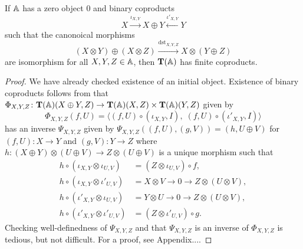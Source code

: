 \begin{proposition}\label{prop:biproduct}
  If $\mathbb{A}$ has a zero object $0$ and binary coproducts
  \begin{equation*}
    X \xrightarrow{\iota_{X,Y}} X \oplus Y \xleftarrow{\iota'_{X,Y}} Y
  \end{equation*}
  such that the canonoical morphisms
  \begin{equation*}
    (X \otimes Y) \oplus (X \otimes Z) \xrightarrow{\mathrm{dst}_{X,Y,Z}} X \otimes (Y \oplus Z)
  \end{equation*}
  are isomorphism for all $X,Y,Z \in \mathbb{A}$, then
  $\mathbf T(\mathbb{A})$ has finite coproducts.
\end{proposition}
\begin{proof}
  We have already checked existence of an initial object. Existence of
  binary coproducts follows from that $\Phi_{X,Y,Z} \colon \mathbf T(\mathbb{A})(X \oplus Y,Z) \to
  \mathbf T(\mathbb{A})(X,Z) \times \mathbf T(\mathbb{A})(Y,Z)$ given by
  \begin{equation*}
    \Phi_{X,Y,Z}(f,U) =
    \langle (f,U) \circ (\iota_{X,Y},I),\; (f,U) \circ (\iota'_{X,Y},I) \rangle
  \end{equation*}
  has an inverse $\Psi_{X,Y,Z}$ given by $\Psi_{X,Y,Z}((f,U),(g,V)) = (h,U \oplus V)$
  for $(f,U) \colon X \to Y$ and $(g,V) \colon Y \to Z$ where
  $h \colon (X \oplus Y) \otimes (U \oplus V) \to Z \otimes (U \oplus V)$
  is a unique morphism such that
  \begin{align*}
    h \circ (\iota_{X,Y} \otimes \iota_{U,V})
    &= (Z \otimes \iota_{U,V}) \circ f, \\
    h \circ (\iota_{X,Y} \otimes \iota'_{U,V})
    &= X \otimes V \longrightarrow 0 \longrightarrow Z \otimes (U \otimes V), \\
    h \circ (\iota'_{X,Y} \otimes \iota_{U,V})
    &= Y \otimes U \longrightarrow 0 \longrightarrow Z \otimes (U \otimes V), \\
    h \circ (\iota'_{X,Y} \otimes \iota'_{U,V})
    &= (Z \otimes \iota'_{U,V}) \circ g.
  \end{align*}
  Checking well-definedness of $\Psi_{X,Y,Z}$ and that $\Psi_{X,Y,Z}$ is 
  an inverse of $\Phi_{X,Y,Z}$ is tedious, but not difficult. For a proof,
  see Appendix....
\end{proof}

